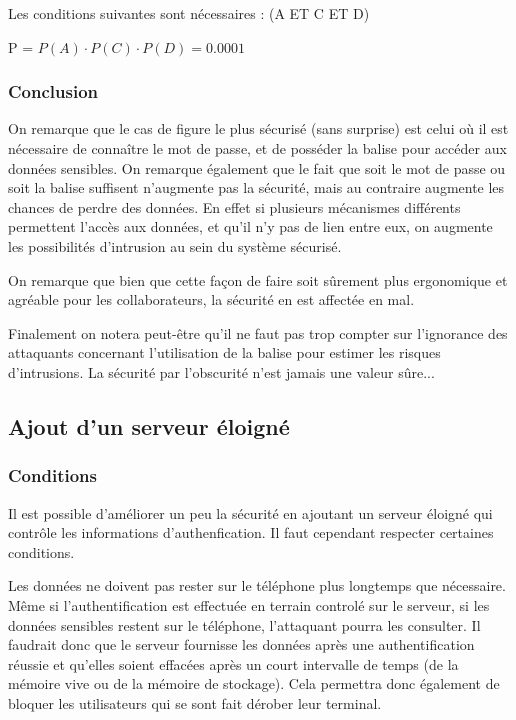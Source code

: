 \documentclass[francais,12pt]{article}
\begin{document}
	 Les conditions suivantes sont nécessaires : (A ET C ET D)
	 
	 P = $ P(A) \cdot P(C) \cdot P(D) = 0.0001 $
	 
	 \subsubsection*{Conclusion}
	 On remarque que le cas de figure le plus sécurisé (sans surprise) est celui où il est nécessaire de connaître le mot de passe, et de posséder la balise pour accéder aux données sensibles. On remarque également que le fait que soit le mot de passe ou soit la balise suffisent n'augmente pas la sécurité, mais au contraire augmente les chances de perdre des données. En effet si plusieurs mécanismes différents permettent l'accès aux données, et qu'il n'y pas de lien entre eux, on augmente les possibilités d'intrusion au sein du système sécurisé. 
	 
	 On remarque que bien que cette façon de faire soit sûrement plus ergonomique et agréable pour les collaborateurs, la sécurité en est affectée en mal.
	 
	 Finalement on notera peut-être qu'il ne faut pas trop compter sur l'ignorance des attaquants concernant l'utilisation de la balise pour estimer les risques d'intrusions. La sécurité par l'obscurité n'est jamais une valeur sûre...
	 
	 \subsection*{Ajout d'un serveur éloigné}
	 \subsubsection*{Conditions}
	 Il est possible d'améliorer un peu la sécurité en ajoutant un serveur éloigné qui contrôle les informations d'authenfication. Il faut cependant respecter certaines conditions. 
	 
	 Les données ne doivent pas rester sur le téléphone plus longtemps que nécessaire. Même si l'authentification est effectuée en terrain controlé sur le serveur, si les données sensibles restent sur le téléphone, l'attaquant pourra les consulter. Il faudrait donc que le serveur fournisse les données après une authentification réussie et qu'elles soient effacées après un court intervalle de temps (de la mémoire vive ou de la mémoire de stockage). Cela permettra donc également de bloquer les utilisateurs qui se sont fait dérober leur terminal. 
	 
\end{document}
